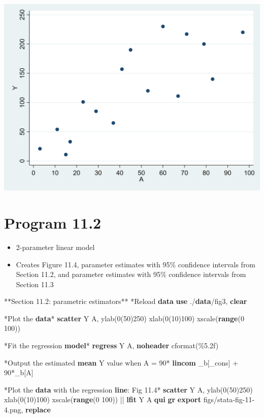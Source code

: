 \documentclass[
  10pt,
]{book}
\newenvironment{Shaded}{\begin{snugshade}}{\end{snugshade}}
\newcommand{\BaseNTok}[1]{\textcolor[rgb]{0.00,0.00,0.81}{#1}}
\newcommand{\DataTypeTok}[1]{\textcolor[rgb]{0.13,0.29,0.53}{#1}}
\newcommand{\KeywordTok}[1]{\textcolor[rgb]{0.13,0.29,0.53}{\textbf{#1}}}
\newcommand{\NormalTok}[1]{#1}
\newcommand{\OtherTok}[1]{\textcolor[rgb]{0.56,0.35,0.01}{#1}}
\providecommand{\tightlist}{%
  \setlength{\itemsep}{0pt}\setlength{\parskip}{0pt}}
\begin{document}
\begin{center}\includegraphics[width=0.85\linewidth]{figs/stata-fig-11-3} \end{center}

\hypertarget{program-11.2-1}{%
\section{Program 11.2}\label{program-11.2-1}}

\begin{itemize}
\tightlist
\item
  2-parameter linear model
\item
  Creates Figure 11.4, parameter estimates with 95\% confidence intervals from Section 11.2, and parameter estimates with 95\% confidence intervals from Section 11.3
\end{itemize}

\begin{Shaded}
\begin{Highlighting}[]
\NormalTok{**Section 11.2: parametric estimators**}
\NormalTok{*Reload }\KeywordTok{data}
\KeywordTok{use}\NormalTok{ ./}\KeywordTok{data}\NormalTok{/fig3, }\KeywordTok{clear}

\NormalTok{*Plot the }\KeywordTok{data}\NormalTok{*}
\KeywordTok{scatter}\NormalTok{ Y A, ylab(0(50)250) xlab(0(10)100) }\BaseNTok{xscale}\NormalTok{(}\KeywordTok{range}\NormalTok{(0 100))}

\NormalTok{*Fit the regression }\KeywordTok{model}\NormalTok{*}
\KeywordTok{regress}\NormalTok{ Y A, }\KeywordTok{noheader}\NormalTok{ cformat(\%5.2f)}

\NormalTok{*Output the estimated }\KeywordTok{mean}\NormalTok{ Y }\OtherTok{value}\NormalTok{ when A = 90*}
\KeywordTok{lincom}\NormalTok{ \_b[}\DataTypeTok{\_cons}\NormalTok{] + 90*\_b[A]}

\NormalTok{*Plot the }\KeywordTok{data}\NormalTok{ with the regression }\KeywordTok{line}\NormalTok{: Fig 11.4*}
\KeywordTok{scatter}\NormalTok{ Y A, ylab(0(50)250) xlab(0(10)100) }\BaseNTok{xscale}\NormalTok{(}\KeywordTok{range}\NormalTok{(0 100)) || }\KeywordTok{lfit}\NormalTok{ Y A}
\KeywordTok{qui} \KeywordTok{gr} \KeywordTok{export}\NormalTok{ figs/stata{-}fig{-}11{-}4.png, }\KeywordTok{replace}
\end{Highlighting}
\end{Shaded}
\end{document}
